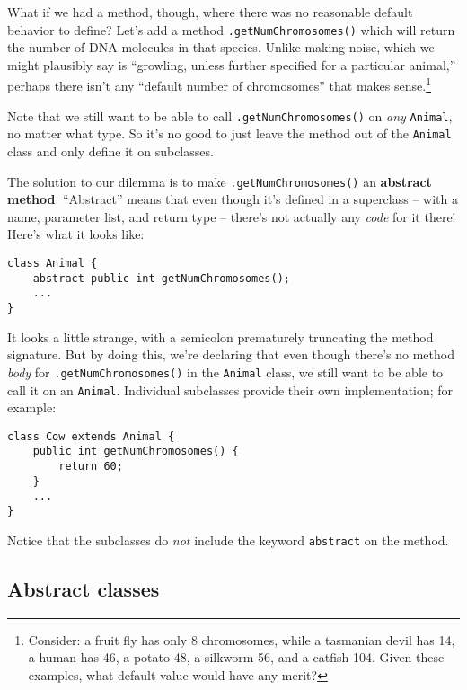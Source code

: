 What if we had a method, though, where there was no reasonable default
behavior to define? Let's add a method \texttt{.getNumChromosomes()} which
will return the number of DNA molecules in that species. Unlike making noise,
which we might plausibly say is ``growling, unless further specified for a
particular animal,'' perhaps there isn't any ``default number of chromosomes''
that makes sense.\footnote{Consider: a fruit fly has only 8 chromosomes, while
a tasmanian devil has 14, a human has 46, a potato 48, a silkworm 56, and a
catfish 104. Given these examples, what default value would have any merit?}

Note that we still want to be able to call \texttt{.getNumChromosomes()} on
\textit{any} \texttt{Animal}, no matter what type. So it's no good to just
leave the method out of the \texttt{Animal} class and only define it on
subclasses.

\begin{samepage}
The solution to our dilemma is to make \texttt{.getNumChromosomes()} an
\textbf{abstract method}. ``Abstract'' means that even though it's defined in a
superclass -- with a name, parameter list, and return type -- there's not
actually any \textit{code} for it there! Here's what it looks like:

\begin{verbatim}
class Animal {
    abstract public int getNumChromosomes();
    ...
}
\end{verbatim}
\end{samepage}

\begin{samepage}
It looks a little strange, with a semicolon prematurely truncating the method
signature. But by doing this, we're declaring that even though there's no
method \textit{body} for \texttt{.getNumChromosomes()} in the \texttt{Animal}
class, we still want to be able to call it on an \texttt{Animal}. Individual 
subclasses provide their own implementation; for example:

\begin{verbatim}
class Cow extends Animal {
    public int getNumChromosomes() {
        return 60;
    }
    ...
}
\end{verbatim}
\end{samepage}

Notice that the subclasses do \textit{not} include the keyword \texttt{abstract}
on the method.

\subsection{Abstract classes}

